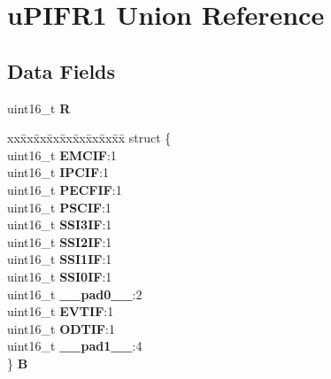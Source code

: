 \hypertarget{unionuPIFR1}{}\section{u\+P\+I\+F\+R1 Union Reference}
\label{unionuPIFR1}
\subsection*{Data Fields}
\begin{DoxyCompactItemize}
\item 
\mbox{\label{unionuPIFR1_ae9a8d47bacd0abb8de38f919894cd35e}} 
uint16\+\_\+t {\bfseries R}
\item 
\mbox{\label{unionuPIFR1_aa18a11994a3b386dd47742f08a24ae42}} 
\begin{tabbing}
xx\=xx\=xx\=xx\=xx\=xx\=xx\=xx\=xx\=\kill
struct \{\\
\>uint16\_t {\bfseries EMCIF}:1\\
\>uint16\_t {\bfseries IPCIF}:1\\
\>uint16\_t {\bfseries PECFIF}:1\\
\>uint16\_t {\bfseries PSCIF}:1\\
\>uint16\_t {\bfseries SSI3IF}:1\\
\>uint16\_t {\bfseries SSI2IF}:1\\
\>uint16\_t {\bfseries SSI1IF}:1\\
\>uint16\_t {\bfseries SSI0IF}:1\\
\>uint16\_t {\bfseries \_\_pad0\_\_}:2\\
\>uint16\_t {\bfseries EVTIF}:1\\
\>uint16\_t {\bfseries ODTIF}:1\\
\>uint16\_t {\bfseries \_\_pad1\_\_}:4\\
\} {\bfseries B}\\


\end{tabbing}
\end{DoxyCompactItemize}
